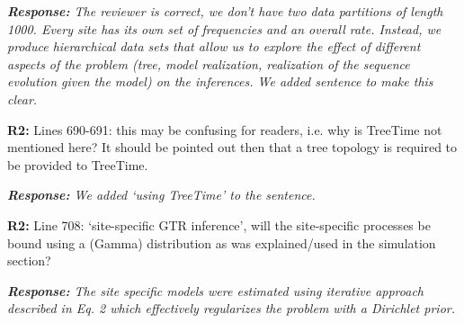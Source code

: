 \documentclass[aps,rmp,onecolumn]{revtex4-1}
\newcommand{\refb}[1]{\textbf{R2:} #1}
\newcommand{\response}[1]{{\it {\color{response}\textbf{Response:} #1}}}
\begin{document}
\response{The reviewer is correct, we don't have two data partitions of length 1000.
Every site has its own set of frequencies and an overall rate.
Instead, we produce hierarchical data sets that allow us to explore the effect of different aspects of the problem (tree, model realization, realization of the sequence evolution given the model) on the inferences.
We added sentence to make this clear. }


\refb{Lines 690-691: this may be confusing for readers, i.e. why is TreeTime not mentioned here? It should be pointed out then that a tree topology is required to be provided to TreeTime.}

\response{We added `using TreeTime' to the sentence.}

\refb{Line 708: ‘site-specific GTR inference’, will the site-specific processes be bound using a (Gamma) distribution as was explained/used in the simulation section?}

\response{The site specific models were estimated using iterative approach described in Eq. 2 which effectively regularizes the problem with a Dirichlet prior. }
\end{document}
